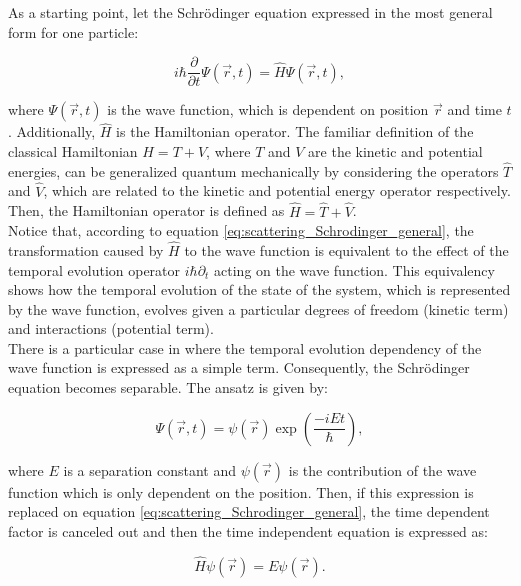 \documentclass[openany]{book}
\begin{document}
As a starting  point, let the Schrödinger equation expressed in the most general form for one particle:  

\begin{equation}\label{eq:scattering_Schrodinger_general}
	i \hbar \frac{\partial}{\partial t} \Psi (\vec r, t)= \hat H \Psi (\vec r, t),
\end{equation}

where $\Psi(\vec r, t)$ is the wave function, which is dependent on position $\vec r$ and time $t$. Additionally, $\hat H$ is the Hamiltonian operator. The familiar definition of the classical Hamiltonian $H = T + V$, where $T$ and $V$ are the kinetic and potential energies, can be generalized quantum mechanically by considering the operators $\hat T$ and $\hat V$, which are related to the kinetic and potential energy operator respectively. Then, the Hamiltonian operator is defined as $\hat H = \hat T + \hat V$. \\

Notice that, according to equation \ref{eq:scattering_Schrodinger_general}, the transformation caused by $\hat H$ to the wave function is equivalent to the effect of the temporal evolution operator  $i \hbar \partial_t$ acting on the wave function. This equivalency shows how the temporal evolution of the state of the system, which is represented by the wave function, evolves given a particular degrees of freedom (kinetic term) and interactions (potential term). \\

There is a particular case in where the temporal evolution dependency of the wave function is expressed as a simple term. Consequently, the Schrödinger equation becomes separable. The ansatz is given by: 


\begin{equation}\label{eq:scattering_Schrodinger_separation}
	\Psi(\vec r, t) = \psi(\vec r)  \exp{\left(\frac{-iEt}{\hbar}\right)}, 
\end{equation}

where $E$ is a separation constant and $\psi(\vec r)$ is the contribution of the wave function which is only dependent on the position. Then, if this expression is replaced on equation \ref{eq:scattering_Schrodinger_general}, the time dependent factor is canceled out and then the time independent equation is expressed as:

\begin{equation}\label{eq:scattering_Schrodinger_timeIndependent}
	\hat H \psi (\vec r)  = E \psi (\vec r) .
\end{equation}
\end{document}
